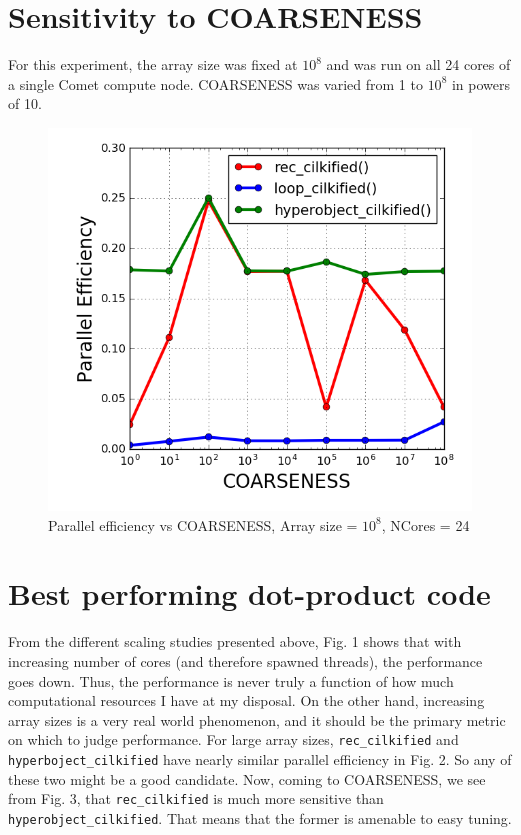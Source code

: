 \documentclass[12pt,letterpaper]{article}
\begin{document}
\section*{Sensitivity to COARSENESS}
\noindent For this experiment, the array size was fixed at $10^8$ and was run on all 24 cores of a single Comet compute node. COARSENESS was varied from 1 to $10^8$ in powers of 10. 
%
\begin{figure}[h]
\centering
\includegraphics[scale=0.5]{coarseness_sensitivity.png}
\caption{Parallel efficiency vs COARSENESS, Array size = $10^8$, NCores = 24}
\end{figure}
%
\section*{Best performing dot-product code}
\noindent From the different scaling studies presented above, Fig. 1 shows that with increasing number of cores (and therefore spawned threads), the performance goes down. Thus, the performance is never truly a function of how much computational resources I have at my disposal. On the other hand, increasing array sizes is a very real world phenomenon, and it should be the primary metric on which to judge performance. For large array sizes, \texttt{rec\_cilkified} and \texttt{hyperboject\_cilkified} have nearly similar parallel efficiency in Fig. 2. So any of these two might be a good candidate. Now, coming to COARSENESS, we see from Fig. 3, that \texttt{rec\_cilkified} is much more sensitive than \texttt{hyperobject\_cilkified}. That means that the former is amenable to easy tuning.\\
\end{document}
